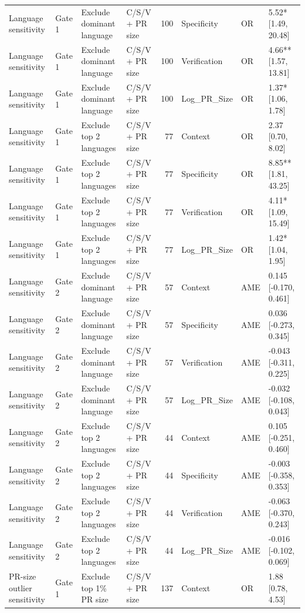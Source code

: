 \begin{table}
\begin{tabular}{llllrlll}
Language sensitivity & Gate 1 & Exclude dominant language & C/S/V + PR size & 100 & Specificity & OR & 5.52* [1.49, 20.48] \\
Language sensitivity & Gate 1 & Exclude dominant language & C/S/V + PR size & 100 & Verification & OR & 4.66** [1.57, 13.81] \\
Language sensitivity & Gate 1 & Exclude dominant language & C/S/V + PR size & 100 & Log\_PR\_Size & OR & 1.37* [1.06, 1.78] \\
Language sensitivity & Gate 1 & Exclude top 2 languages & C/S/V + PR size & 77 & Context & OR & 2.37 [0.70, 8.02] \\
Language sensitivity & Gate 1 & Exclude top 2 languages & C/S/V + PR size & 77 & Specificity & OR & 8.85** [1.81, 43.25] \\
Language sensitivity & Gate 1 & Exclude top 2 languages & C/S/V + PR size & 77 & Verification & OR & 4.11* [1.09, 15.49] \\
Language sensitivity & Gate 1 & Exclude top 2 languages & C/S/V + PR size & 77 & Log\_PR\_Size & OR & 1.42* [1.04, 1.95] \\
Language sensitivity & Gate 2 & Exclude dominant language & C/S/V + PR size & 57 & Context & AME & 0.145 [-0.170, 0.461] \\
Language sensitivity & Gate 2 & Exclude dominant language & C/S/V + PR size & 57 & Specificity & AME & 0.036 [-0.273, 0.345] \\
Language sensitivity & Gate 2 & Exclude dominant language & C/S/V + PR size & 57 & Verification & AME & -0.043 [-0.311, 0.225] \\
Language sensitivity & Gate 2 & Exclude dominant language & C/S/V + PR size & 57 & Log\_PR\_Size & AME & -0.032 [-0.108, 0.043] \\
Language sensitivity & Gate 2 & Exclude top 2 languages & C/S/V + PR size & 44 & Context & AME & 0.105 [-0.251, 0.460] \\
Language sensitivity & Gate 2 & Exclude top 2 languages & C/S/V + PR size & 44 & Specificity & AME & -0.003 [-0.358, 0.353] \\
Language sensitivity & Gate 2 & Exclude top 2 languages & C/S/V + PR size & 44 & Verification & AME & -0.063 [-0.370, 0.243] \\
Language sensitivity & Gate 2 & Exclude top 2 languages & C/S/V + PR size & 44 & Log\_PR\_Size & AME & -0.016 [-0.102, 0.069] \\
PR-size outlier sensitivity & Gate 1 & Exclude top 1\% PR size & C/S/V + PR size & 137 & Context & OR & 1.88 [0.78, 4.53] \\

\end{tabular}
\end{table}
